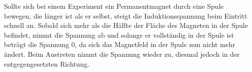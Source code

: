 Sollte sich bei einem Experiment ein Permanentmagnet durch eine Spule bewegen, die länger ist als er selbst, steigt die Induktionsspannung beim Eintritt schnell an. Sobald sich mehr als die Hälfte der Fläche des Magneten in der Spule befindet, nimmt die Spannung ab und solange er vollständig in der Spule ist beträgt die Spannung 0, da sich das Magnetfeld in der Spule nun nicht mehr ändert. Beim Austreten nimmt die Spannung wieder zu, diesmal jedoch in der entgegengesetzten Richtung.